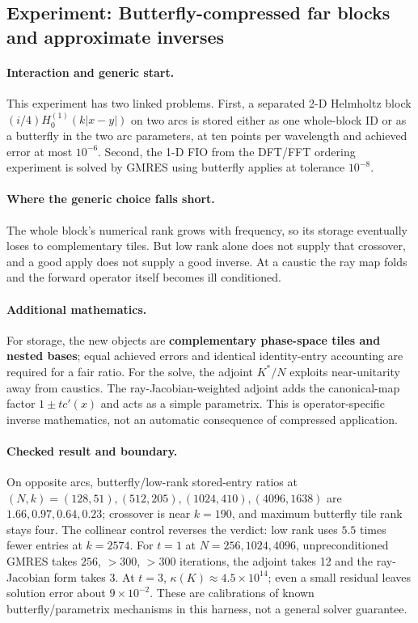 \subsection{Experiment: Butterfly-compressed far blocks and approximate inverses}
\label{exp:e4}
\paragraph{Interaction and generic start.} This experiment has two linked problems. First, a separated 2-D Helmholtz block $(i/4)H_0^{(1)}(k|x-y|)$ on two arcs is stored either as one whole-block ID or as a butterfly in the two arc parameters, at ten points per wavelength and achieved error at most $10^{-6}$. Second, the 1-D FIO from the DFT/FFT ordering experiment is solved by GMRES using butterfly applies at tolerance $10^{-8}$.

\paragraph{Where the generic choice falls short.} The whole block's numerical rank grows with frequency, so its storage eventually loses to complementary tiles. But low rank alone does not supply that crossover, and a good apply does not supply a good inverse. At a caustic the ray map folds and the forward operator itself becomes ill conditioned.

\paragraph{Additional mathematics.} For storage, the new objects are \textbf{complementary phase-space tiles and nested bases}; equal achieved errors and identical identity-entry accounting are required for a fair ratio. For the solve, the adjoint $K^*/N$ exploits near-unitarity away from caustics. The ray-Jacobian-weighted adjoint adds the canonical-map factor $1\pm t c'(x)$ and acts as a simple parametrix. This is operator-specific inverse mathematics, not an automatic consequence of compressed application.

\paragraph{Checked result and boundary.} On opposite arcs, butterfly/low-rank stored-entry ratios at $(N,k)=(128,51),(512,205),(1024,410),(4096,1638)$ are $1.66,0.97,0.64,0.23$; crossover is near $k=190$, and maximum butterfly tile rank stays four. The collinear control reverses the verdict: low rank uses $5.5$ times fewer entries at $k=2574$. For $t=1$ at $N=256,1024,4096$, unpreconditioned GMRES takes $256$, $>300$, $>300$ iterations, the adjoint takes 12 and the ray-Jacobian form takes 3. At $t=3$, $\kappa(K)\approx4.5\times10^{14}$; even a small residual leaves solution error about $9\times10^{-2}$. These are calibrations of known butterfly/parametrix mechanisms in this harness, not a general solver guarantee.

